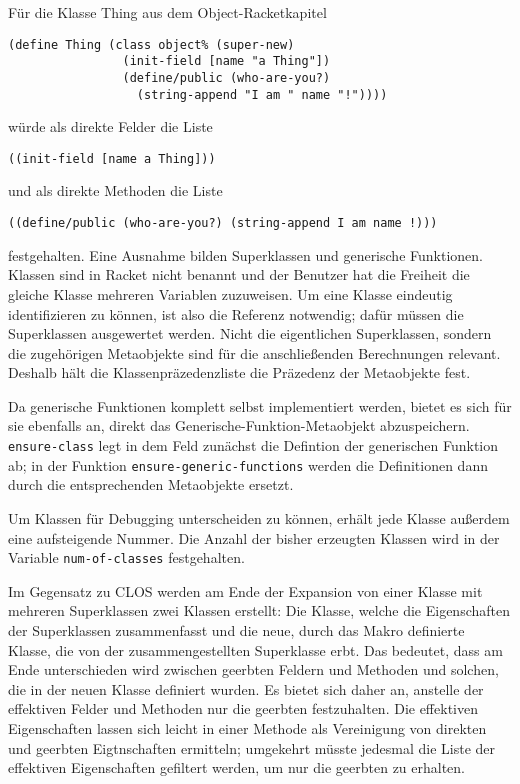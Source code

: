 Für die Klasse Thing aus dem Object-Racketkapitel

\begin{lstlisting}
(define Thing (class object% (super-new)
                (init-field [name "a Thing"])
                (define/public (who-are-you?) 
                  (string-append "I am " name "!"))))
\end{lstlisting}

würde als direkte Felder die Liste 

\texttt{{\textquotesingle}((init-field [name {\qq}a Thing\qq]))} 

und als direkte Methoden die Liste 

\texttt{{\textquotesingle}((define/public (who-are-you?) (string-append {\qq}I am {\qq} name \qq!\qq)))} 

festgehalten. Eine Ausnahme bilden Superklassen und generische Funktionen. Klassen sind in Racket nicht benannt und der Benutzer hat die Freiheit die gleiche Klasse mehreren Variablen zuzuweisen. Um eine Klasse eindeutig identifizieren zu können, ist also die Referenz notwendig; dafür müssen die Superklassen ausgewertet werden. Nicht die eigentlichen Superklassen, sondern die zugehörigen Metaobjekte sind für die anschließenden Berechnungen relevant. Deshalb hält die Klassenpräzedenzliste die Präzedenz der Metaobjekte fest. 

Da generische Funktionen komplett selbst implementiert werden, bietet es sich für sie ebenfalls an, direkt das Generische-Funktion-Metaobjekt abzuspeichern. \texttt{ensure-class} legt in dem Feld zunächst die Defintion der generischen Funktion ab; in der Funktion \texttt{ensure-generic-functions} werden die Definitionen dann durch die entsprechenden Metaobjekte ersetzt.

Um Klassen für Debugging unterscheiden zu können, erhält jede Klasse außerdem eine aufsteigende Nummer. Die Anzahl der bisher erzeugten Klassen wird in der Variable \texttt{num-of-classes} festgehalten.

Im Gegensatz zu CLOS werden am Ende der Expansion von einer Klasse mit mehreren Superklassen zwei Klassen erstellt: Die Klasse, welche die Eigenschaften der Superklassen zusammenfasst und die neue, durch das Makro definierte Klasse, die von der zusammengestellten Superklasse erbt. Das bedeutet, dass am Ende unterschieden wird zwischen geerbten Feldern und Methoden und solchen, die in der neuen Klasse definiert wurden. Es bietet sich daher an, anstelle der effektiven Felder und Methoden nur die geerbten festzuhalten. Die effektiven Eigenschaften lassen sich leicht in einer Methode als Vereinigung von direkten und geerbten Eigtnschaften ermitteln; umgekehrt müsste jedesmal die Liste der effektiven Eigenschaften gefiltert werden, um nur die geerbten zu erhalten. 

